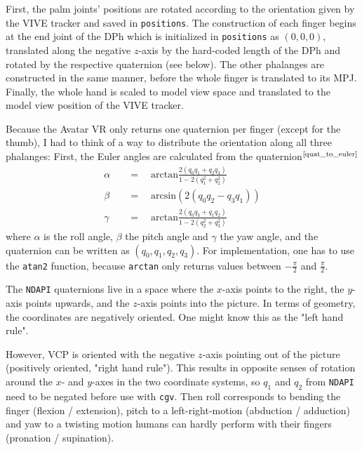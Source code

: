 \documentclass[hyperref, bachelorofscience]{cgvpub}
\newcommand{\newcite}[1]{$ ^{\text{\cite{#1}}} $}
\begin{document}
First, the palm joints' positions are rotated according to the orientation given by the \Gls{VIVE} tracker and saved in \lstinline|positions|. The construction of each finger begins at the end joint of the \gls{DPh} which is initialized in \lstinline|positions| as $ (0, 0, 0) $, translated along the negative $ z $-axis by the hard-coded length of the \gls{DPh} and rotated by the respective quaternion (see below). The other phalanges are constructed in the same manner, before the whole finger is translated to its \gls{MPJ}. Finally, the whole hand is scaled to model view space and translated to the model view position of the \Gls{VIVE} tracker.

Because the Avatar VR only returns one quaternion per finger (except for the thumb), I had to think of a way to distribute the orientation along all three phalanges: First, the Euler angles are calculated from the quaternion\newcite{quat_to_euler}
\begin{align*}
\alpha \quad&=\quad \mbox{arctan} \frac {2(q_0 q_1 + q_2 q_3)} {1 - 2(q_1^2 + q_2^2)} \\
\beta \quad&=\quad \mbox{arcsin} (2(q_0 q_2 - q_3 q_1)) \\
\gamma \quad&=\quad \mbox{arctan} \frac {2(q_0 q_3 + q_1 q_2)} {1 - 2(q_2^2 + q_3^2)}
\end{align*}
where $ \alpha $ is the roll angle, $ \beta $ the pitch angle and $ \gamma $ the yaw angle, and the quaternion can be written as $ (q_{0}, q_{1}, q_{2}, q_{3}) $. For implementation, one has to use the \lstinline|atan2| function, because \lstinline|arctan| only returns values between $ -\frac{\pi}{2} $ and $ \frac{\pi}{2} $.

The \lstinline|NDAPI| quaternions live in a space where the $ x $-axis points to the right, the $ y $-axis points upwards, and the $ z $-axis points into the picture. In terms of geometry, the coordinates are negatively oriented. One might know this as the "left hand rule". 

However, \gls{VCP} is oriented with the negative $ z $-axis pointing out of the picture (positively oriented, "right hand rule"). This results in opposite senses of rotation around the $ x $- and $ y $-axes in the two coordinate systems, so $ q_{1} $ and $ q_{2} $ from \lstinline|NDAPI| need to be negated before use with \lstinline|cgv|. Then roll corresponds to bending the finger (flexion / extension), pitch to a left-right-motion (abduction / adduction) and yaw to a twisting motion humans can hardly perform with their fingers (pronation / supination).
\end{document}
